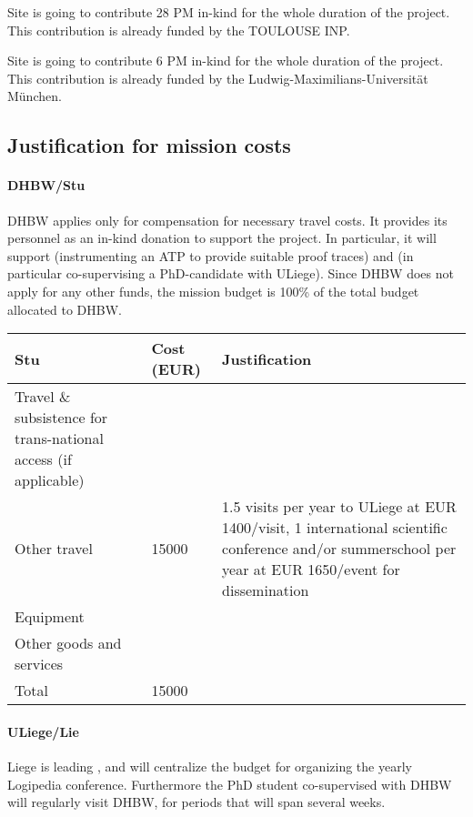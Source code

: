 Site  is going to contribute 28 PM in-kind for the whole duration of the project.
This contribution is already funded by the TOULOUSE INP.

Site  is going to contribute 6 PM in-kind for the whole duration of the project.
This contribution is already funded by the Ludwig-Maximilians-Universit\"at M\"unchen.


\subsection*{Justification for mission costs}

\paragraph*{DHBW/Stu}

DHBW applies only for compensation for necessary travel costs. It
provides its personnel as an in-kind donation to support the
project. In particular, it will support  (instrumenting
an ATP to provide suitable proof traces) and  (in
particular co-supervising a PhD-candidate with ULiege). Since DHBW does
not apply for any other funds, the mission budget is 100\% of the
total budget allocated to DHBW.

\medskip

\noindent
\begin{tabular}{|p{9em}|l|p{}|}
\hline
  Stu & Cost (EUR)  & Justification \\
  \hline
  Travel \& subsistence for trans-national access (if applicable) & & \\
  \hline
  Other travel & 15000 & 1.5 visits per year to ULiege at EUR
                         1400/visit, 1 international scientific
                         conference and/or summerschool per year at
                         EUR 1650/event for dissemination \\
  \hline
  Equipment & & \\
  \hline
  Other goods and services & & \\
  \hline
  \hline
  Total & 15000 & \\
  \hline
\end{tabular}

\paragraph*{ULiege/Lie}

Liege is leading , and will centralize the budget for
organizing the yearly Logipedia conference.  Furthermore the PhD student
co-supervised with DHBW will regularly visit DHBW, for periods that will span
several weeks.


